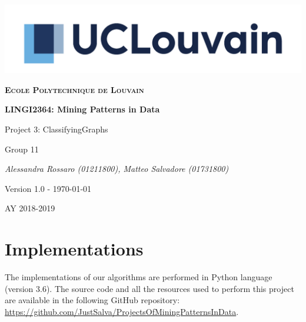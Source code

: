 \documentclass[11pt, a4paper]{article}
\begin{document}
	\begin{titlepage}
		\centering
		\includegraphics[scale =0.8]{logo.jpg}\par\vspace{1cm}
		{\scshape\LARGE\bfseries Ecole Polytechnique de Louvain\par}
		\vspace{1.5cm}
		{\scshape\Large \par}
		\vspace{1.5cm}
		{\huge\bfseries LINGI2364: Mining Patterns in Data \par}
		\vspace{1cm}
		{\Huge Project 3: ClassifyingGraphs \par}
		\vspace{2cm}
		{\LARGE Group 11\par}
		\vspace{1cm}
		{\Large\itshape Alessandra Rossaro (01211800), Matteo Salvadore (01731800)\par}
		\vspace{2cm}
		{\small Version 1.0 - \today\par}

		\vfill

		{\large AY 2018-2019\par}
	\end{titlepage}

	\section{Implementations}
		The implementations of our algorithms are performed in Python language (version 3.6).
		The source code and all the resources used to perform this project are available in the following GitHub repository: \url{https://github.com/JustSalva/ProjectsOfMiningPatternsInData}.\newline
	
\end{document}

